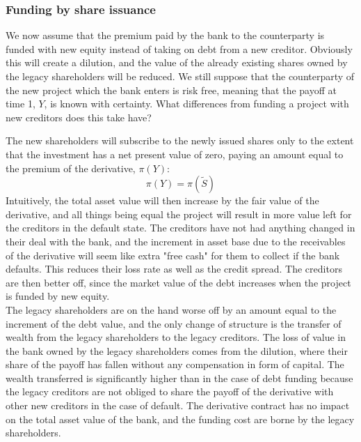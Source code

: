 \documentclass[../main.tex]{subfiles}
\begin{document}
    \subsubsection{Funding by share issuance}
        We now assume that the premium paid by the bank to the counterparty is funded with new equity instead of taking on debt from a new creditor. Obviously this will create a dilution, and the value of the already existing shares owned by the legacy shareholders will be reduced. We still suppose that the counterparty of the new project which the bank enters is risk free, meaning that the payoff at time 1, $Y$, is known with certainty. What differences from funding a project with new creditors does this take have?

        The new shareholders will subscribe to the newly issued shares only to the extent that the investment has a net present value of zero, paying an amount equal to the premium of the derivative, $\pi(Y)$:
        \begin{equation}
            \pi(Y) = \pi(\tilde{S})
        \end{equation}
        Intuitively, the total asset value will then increase by the fair value of the derivative, and all things being equal the project will result in more value left for the creditors in the default state. The creditors have not had anything changed in their deal with the bank, and the increment in asset base due to the receivables of the derivative will seem like extra "free cash" for them to collect if the bank defaults. This reduces their loss rate as well as the credit spread. The creditors are then better off, since the market value of the debt increases when the project is funded by new equity.\\
        The legacy shareholders are on the hand worse off by an amount equal to the increment of the debt value, and the only change of structure is the transfer of wealth from the legacy shareholders to the legacy creditors. The loss of value in the bank owned by the legacy shareholders comes from the dilution, where their share of the payoff has fallen without any compensation in form of capital. The wealth transferred is significantly higher than in the case of debt funding because the legacy creditors are not obliged to share the payoff of the derivative with other new creditors in the case of default. The derivative contract has no impact on the total asset value of the bank, and the funding cost are borne by the legacy shareholders.
\end{document}
